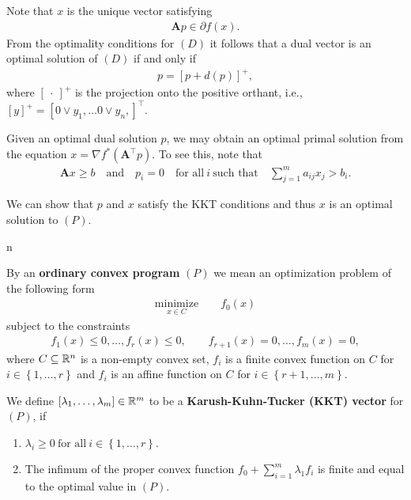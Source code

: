 Note that $x$ is the unique vector satisfying 
\begin{gather}
  \mathbf{A}p
  \in 
  \partial
  f(x)
  .
\end{gather}
From the optimality conditions for $(D)$ it follows that 
a dual vector is an optimal solution of $(D)$
if and only if 
\begin{gather}
  p
  =
  [p + d(p)]^+
  ,
\end{gather}
where $[\ \cdot \ ]^+$ is the projection onto the positive orthant, i.e.,
$
  [y]^+
  =
  [
    0 \lor y_1,
    \ldots
    0 \lor y_n,
  ]
  ^\top
  .
$

Given an optimal dual solution $p$,
we may obtain an optimal primal solution from the equation 
$
  x=
  \nabla
  f^*
  (
    \mathbf{A}^\top
    p
  )
.
$
To see this, 
note that 
 \begin{gather}
   \mathbf{A}x \ge b
   \quad
   \text{and}
   \quad
   p_i 
   =
   0
   \quad 
   \text{for all}
   \ 
   i
   \ 
   \text{such that}
   \quad 
   \sum_{j=1}^{m} 
   a_{ij}
   x_j
   >
   b_i
   .
 \end{gather}

 We can show that $p$ and $x$ satisfy the KKT conditions and thus $x$ is an optimal solution to $(P)$.

n 

\begin{definition}
  \emph{\cite[§28]{Rockafellar1970}}
  By an \textbf{ordinary convex program}
  $(P)$
  we mean an optimization problem of the following form
  \begin{gather*}
    \underset{x\in C}{\mathrm{minimize}}
    \qquad
    f_0(x)
  \end{gather*}
subject to the constraints
\begin{gather}
  f_1(x)\le 0,
  \ldots,
  f_r(x)\le 0,
  \qquad
  f_{r+1}(x)= 0,
  \ldots,
  f_m(x)= 0,
\end{gather}
where $C\subseteq \mathbb{R}^n$
is a non-empty convex set,
$f_i$ is a finite convex function on $C$ for $i\in \left\{ 1,\ldots,r \right\}$
 and 
 $f_i$ is an affine function on $C$ for $i\in \left\{ r+1, \ldots, m \right\}.$
\end{definition}

\begin{definition}
  We define 
  $
    [\lambda_1, \ldots, \lambda_m]\in \mathbb{R}^m
  $
  to be a \textbf{Karush-Kuhn-Tucker (KKT) vector}
  for $(P)$, if
  \begin{enumerate}[label={(\roman*)}]
    \item
      $
        \lambda_i \ge 0
        \ 
        \text{for all}
        \ 
        i\in \left\{ 1,\ldots,r \right\}.
      $
    \item
      The infimum of the proper convex function 
      $
        f_0
        +
        \sum_{i=1}^{m}
        \lambda_1 f_i
      $
      is finite and equal to the optimal value in $(P).$
  \end{enumerate}
\end{definition}

